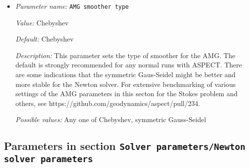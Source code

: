 \begin{itemize}
{\it Possible values:} An integer $n$ such that $0\leq n \leq 2147483647$
\item {\it Parameter name:} {\tt AMG smoother type}
\label{parameters:Solver parameters/AMG parameters/AMG smoother type}


{\it Value:} Chebyshev


{\it Default:} Chebyshev


{\it Description:} This parameter sets the type of smoother for the AMG. The default is strongly recommended for any normal runs with ASPECT. There are some indications that the symmetric Gaus-Seidel might be better and more stable for the Newton solver. For extensive benchmarking of various settings of the AMG parameters in this secton for the Stokes problem and others, see https://github.com/geodynamics/aspect/pull/234.


{\it Possible values:} Any one of Chebyshev, symmetric Gauss-Seidel
\end{itemize}

\subsection{Parameters in section \tt Solver parameters/Newton solver parameters}
\label{parameters:Solver_20parameters/Newton_20solver_20parameters}

